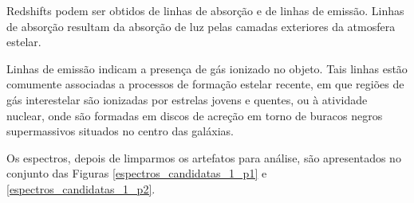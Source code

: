 Redshifts podem ser obtidos de linhas de absorção e de linhas de emissão. Linhas de absorção resultam da absorção de luz pelas camadas exteriores da atmosfera estelar.

Linhas de emissão indicam a presença de gás ionizado no objeto. Tais linhas estão comumente associadas a processos de formação estelar recente, em que regiões de gás interestelar são ionizadas por estrelas jovens e quentes, ou à atividade nuclear, onde são formadas em discos de acreção em torno de buracos negros supermassivos situados no centro das galáxias.



Os espectros, depois de limparmos os artefatos para análise, são apresentados no conjunto das Figuras \ref{espectros_candidatas_1_p1} e \ref{espectros_candidatas_1_p2}.

